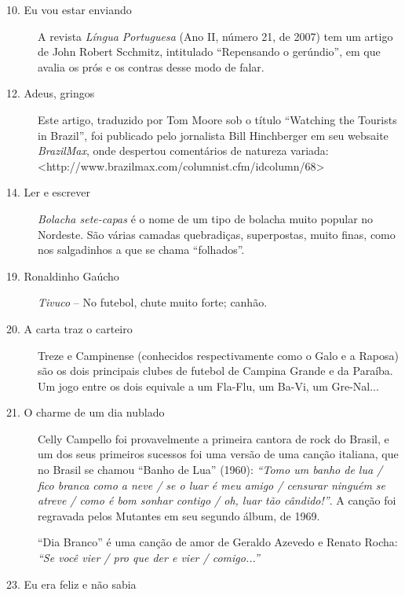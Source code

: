\begin{description}
\item[10. Eu vou estar enviando]

A revista \textit{Língua Portuguesa} (Ano II, número 21, de 2007) tem
um artigo de John Robert Scchmitz, intitulado “Repensando o
gerúndio”, em que avalia os prós e os contras desse modo de falar.

\item[12. Adeus, gringos]

Este artigo, traduzido por Tom Moore sob o título “Watching the
Tourists in Brazil”, foi publicado pelo jornalista Bill Hinchberger
em seu websaite \textit{BrazilMax}, onde despertou comentários de
natureza variada:\\
<http://www.brazilmax.com/columnist.cfm/idcolumn/68>

\item[14. Ler e escrever]

\textit{Bolacha sete-capas} é o nome de um tipo de bolacha muito
popular no Nordeste.  São várias camadas quebradiças, superpostas,
muito finas, como nos salgadinhos a que se chama “folhados”.

\item[19. Ronaldinho Gaúcho]

\textit{Tivuco} -- No futebol, chute muito forte; canhão. 

\item[20. A carta traz o carteiro]

Treze e Campinense (conhecidos respectivamente como o Galo e a Raposa)
são os dois principais clubes de futebol de Campina Grande e da
Paraíba.  Um jogo entre os dois equivale a um Fla-Flu, um Ba-Vi, um
Gre-Nal...

\item[21. O charme de um dia nublado]

Celly Campello foi provavelmente a primeira cantora de rock do Brasil,
e um dos seus primeiros sucessos foi uma versão de uma canção
italiana, que no Brasil se chamou “Banho de Lua” (1960):
\textit{“Tomo um banho de lua / fico branca como a neve / se o luar é
meu amigo / censurar ninguém se atreve / como é bom sonhar contigo /
oh, luar tão cândido!”}.  A canção foi regravada pelos Mutantes em
seu segundo álbum, de 1969.  

“Dia Branco” é uma canção de amor de Geraldo Azevedo e Renato Rocha:
\textit{“Se você vier / pro que der e vier / comigo...”}

\item[23. Eu era feliz e não sabia]


\end{description}
